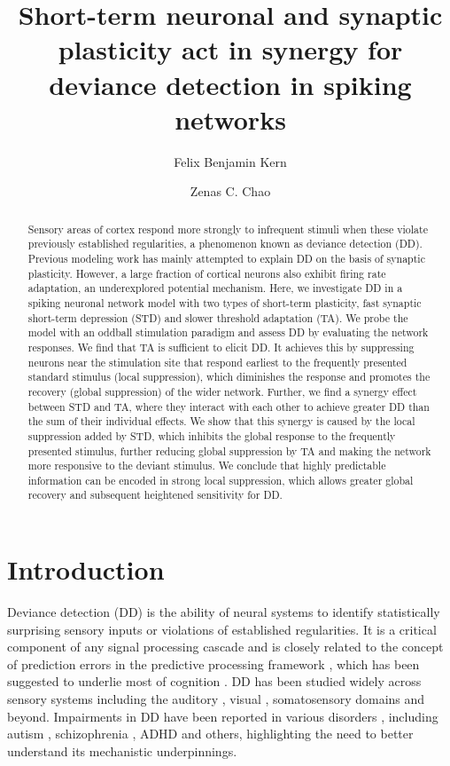 \documentclass[9pt,lineno,onehalfspacing]{elife}
\title{Short-term neuronal and synaptic plasticity act in synergy for deviance detection in spiking networks}
\author[1]{Felix Benjamin Kern}
\author[1*]{Zenas C. Chao}
\affil[1]{International Research Center for Neurointelligence (WPI-IRCN), The University of Tokyo}
\begin{document}
\maketitle

\begin{abstract}
Sensory areas of cortex respond more strongly to infrequent stimuli when these violate previously established regularities, a phenomenon known as deviance detection (DD). Previous modeling work has mainly attempted to explain DD on the basis of synaptic plasticity. However, a large fraction of cortical neurons also exhibit firing rate adaptation, an underexplored potential mechanism. Here, we investigate DD in a spiking neuronal network model with two types of short-term plasticity, fast synaptic short-term depression (STD) and slower threshold adaptation (TA). We probe the model with an oddball stimulation paradigm and assess DD by evaluating the network responses. We find that TA is sufficient to elicit DD. It achieves this by suppressing neurons near the stimulation site that respond earliest to the frequently presented standard stimulus (local suppression), which diminishes the response and promotes the recovery (global suppression) of the wider network. Further, we find a synergy effect between STD and TA, where they interact with each other to achieve greater DD than the sum of their individual effects. We show that this synergy is caused by the local suppression added by STD, which inhibits the global response to the frequently presented stimulus, further reducing global suppression by TA and making the network more responsive to the deviant stimulus. We conclude that highly predictable information can be encoded in strong local suppression, which allows greater global recovery and subsequent heightened sensitivity for DD.
\end{abstract}


\section{Introduction}\label{sec:intro}

Deviance detection (DD) is the ability of neural systems to identify statistically surprising sensory inputs or violations of established regularities. It is a critical component of any signal processing cascade and is closely related to the concept of prediction errors in the predictive processing framework \citep{Bendixen2012-nx, Khouri2015-gr, Carbajal2018-sd, Fong2020-em}, which has been suggested to underlie most of cognition \citep{Friston2005-jz, Clark2015-gl}. DD has been studied widely across sensory systems including the auditory \citep{Nelken2014-wr, Escera2014-tv, Carbajal2018-sd}, visual \citep{Winkler2012-pr, Pazo-Alvarez2003-kv}, somatosensory \citep{Naatanen2009-jx} domains and beyond. Impairments in DD have been reported in various disorders \citep{Fong2020-em}, including autism \citep{Schwartz2018-bc, Goris2018-bv, Hudac2018-jl, Vlaskamp2017-vs, Chen2020-lu}, schizophrenia \citep{Koshiyama2020-ca, Kim2020-fb, Salisbury2020-sd, Tada2019-lj}, ADHD \citep{Kim2021-uj, Hsieh2021-ti, Lee2020-np} and others, highlighting the need to better understand its mechanistic underpinnings.
\end{document}
